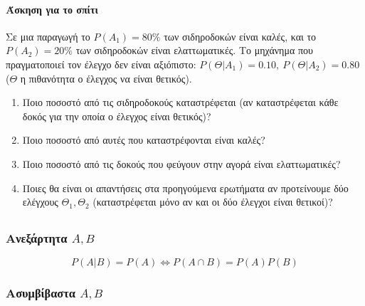 \documentclass[11pt,a4paper,titlepage,draft]{article}
\begin{document}
\paragraph{Άσκηση για το σπίτι}
Σε μια παραγωγή το \(P(A_1)=80\%\) των σιδηροδοκών είναι καλές, και το \(P(A_2)=20\%\) των σιδηροδοκών είναι ελαττωματικές. Το μηχάνημα που πραγματοποιεί τον έλεγχο δεν είναι αξιόπιστο: \(P(\Theta|A_1)=0.10,\ P(\Theta|A_2)=0.80\) (\(\Theta\) η πιθανότητα ο έλεγχος να είναι θετικός).
\begin{enumerate}
\item Ποιο ποσοστό από τις σιδηροδοκούς καταστρέφεται (αν καταστρέφεται κάθε δοκός για την οποία ο έλεγχος είναι θετικός)?
\item Ποιο ποσοστό από αυτές που καταστρέφονται είναι καλές?
\item Ποιο ποσοστό από τις δοκούς που φεύγουν στην αγορά είναι ελαττωματικές?
\item Ποιες θα είναι οι απαντήσεις στα προηγούμενα ερωτήματα αν προτείνουμε δύο ελέγχους \(\Theta_1,\Theta_2\) {\small (καταστρέφεται μόνο αν και οι δύο έλεγχοι είναι θετικοί)}?
\end{enumerate}

\subsection{}

\subsubsection{Ανεξάρτητα \(A,B\)}

\begin{center}
\end{center}

\[P(A|B)=P(A) \iff P(A\cap B)=P(A)P(B)\]

\subsubsection{Ασυμβίβαστα \(A,B\)}
\begin{center}
\end{center}
\end{document}
